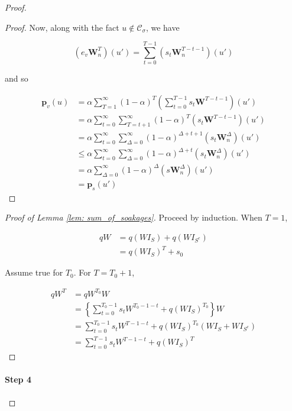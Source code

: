 \documentclass{article}
\newcommand{\1}{\mathbf{1}}
\newcommand{\pbf}{\mathbf{p}}
\newcommand{\Wbf}{\mathbf{W}}
\newcommand{\Cset}{\mathcal{C}}
\newcommand{\Csig}{\Cset_{\sigma}}
\theoremstyle{aldenthm}
\begin{document}
\begin{proof}
\begin{proof}
		Now, along with the fact $u \not\in \Csig$, we have
		
		\begin{equation*}
		\left(e_v \Wbf_n^T \right)(u') = \sum_{t = 0}^{T - 1} \left(s_t \Wbf_n^{T - t - 1} \right)(u')
		\end{equation*}
		
		and so
		
		\begin{align*}
		\pbf_v(u) & = \alpha \sum_{T=1}^{\infty} (1 - \alpha)^T \left( \sum_{t = 0}^{T - 1} s_t \Wbf^{T - t - 1} \right)(u') \\
		& = \alpha \sum_{t=0}^{\infty} \sum_{T = t + 1}^{\infty} (1 - \alpha)^T \left( s_t \Wbf^{T - t - 1} \right)(u')\\
		& = \alpha \sum_{t=0}^{\infty} \sum_{\Delta = 0}^{\infty} (1 - \alpha)^{\Delta + t + 1} \left( s_t \Wbf_n^{\Delta} \right)(u') \\
		& \leq \alpha \sum_{t=0}^{\infty} \sum_{\Delta = 0}^{\infty} (1 - \alpha)^{\Delta + t } \left( s_t \Wbf_n^{\Delta} \right)(u') \\
		& = \alpha \sum_{\Delta = 0}^{\infty} (1 - \alpha)^{\Delta} \left(s \Wbf_n^{\Delta}\right)(u') \\
		& = \pbf_s(u')
		\end{align*}
	\end{proof}
	
	\begin{proof}[Proof of Lemma \ref{lem: sum_of_soakages}]
		Proceed by induction. When $T = 1$,
		
		\begin{align*}
		qW & = q(WI_S) + q(WI_{S^c}) \\
		& = q(W I_S)^T + s_0 
		\end{align*}
		
		Assume true for $T_0$. For $T = T_0 + 1$,
		
		\begin{align*}
		qW^T & = qW^{T_0}W \\
		& = \left\{ \sum_{t = 0}^{T_0 - 1} s_t W^{T_0 - 1 - t} + q(WI_S)^{T_0} \right\} W \\
		& =  \sum_{t = 0}^{T_0 - 1} s_t W^{T - 1 - t} + q(WI_S)^{T_0}(WI_S + WI_{S^c}) \\
		& =  \sum_{t = 0}^{T - 1} s_t W^{T - 1 - t} + q(WI_S)^{T}
		\end{align*}
	\end{proof}
	
	\paragraph{Step 4}
	

\end{proof}
\end{document}
